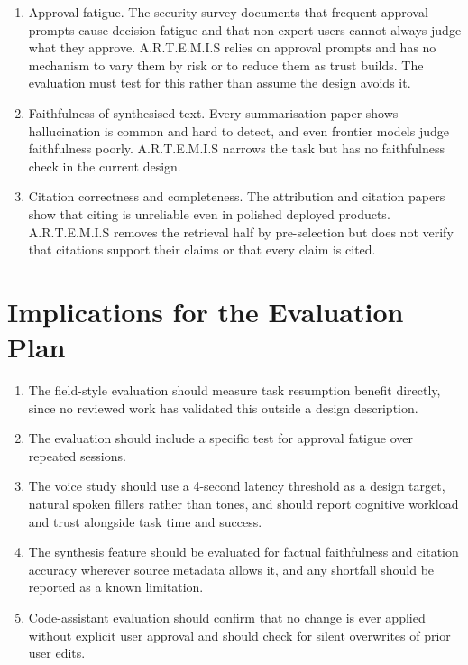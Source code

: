 \documentclass[11pt,a4paper]{report}
\newcommand{\artemis}{A.R.T.E.M.I.S}
\begin{document}
\begin{enumerate}
  \item Approval fatigue. The security survey documents that frequent
        approval prompts cause decision fatigue and that non-expert
        users cannot always judge what they approve. \artemis{} relies
        on approval prompts and has no mechanism to vary them by risk
        or to reduce them as trust builds. The evaluation must test for
        this rather than assume the design avoids it.
  \item Faithfulness of synthesised text. Every summarisation paper
        shows hallucination is common and hard to detect, and even
        frontier models judge faithfulness poorly. \artemis{} narrows
        the task but has no faithfulness check in the current design.
  \item Citation correctness and completeness. The attribution and
        citation papers show that citing is unreliable even in polished
        deployed products. \artemis{} removes the retrieval half by
        pre-selection but does not verify that citations support their
        claims or that every claim is cited.
\end{enumerate}

\section{Implications for the Evaluation Plan}

\begin{enumerate}
  \item The field-style evaluation should measure task resumption
        benefit directly, since no reviewed work has validated this
        outside a design description.
  \item The evaluation should include a specific test for approval
        fatigue over repeated sessions.
  \item The voice study should use a 4-second latency threshold as a
        design target, natural spoken fillers rather than tones, and
        should report cognitive workload and trust alongside task time
        and success.
  \item The synthesis feature should be evaluated for factual
        faithfulness and citation accuracy wherever source metadata
        allows it, and any shortfall should be reported as a known
        limitation.
  \item Code-assistant evaluation should confirm that no change is ever
        applied without explicit user approval and should check for
        silent overwrites of prior user edits.
\end{enumerate}

\printbibliography[heading=bibintoc,title={References}]
\end{document}
